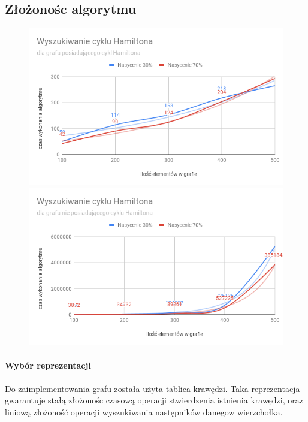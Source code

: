 \documentclass[]{article}
\begin{document}
	\subsection{Złożonośc algorytmu}
		\begin{figure}[H]
			\includegraphics[scale=0.6]{hamilton.png}
			\includegraphics[scale=0.6]{hamiltonwo.png}
		\end{figure}
		\paragraph{Wybór reprezentacji}
		Do zaimplementowania grafu została użyta tablica krawędzi. Taka reprezentacja gwarantuje stałą złożonośc czasową operacji stwierdzenia istnienia krawędzi, oraz liniową złożoność operacji wyszukiwania następników danegow wierzchołka.
		
\end{document}
